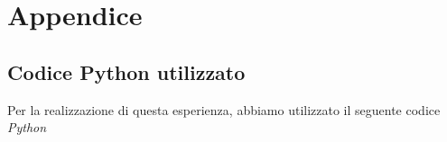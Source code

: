 \documentclass{article}
\begin{document}
\section{Appendice}
\subsection{Codice Python utilizzato}
Per la realizzazione di questa esperienza, abbiamo utilizzato il seguente codice \emph{Python}
\begin{lstlisting}[language=Python]

\end{lstlisting}
\end{document}
